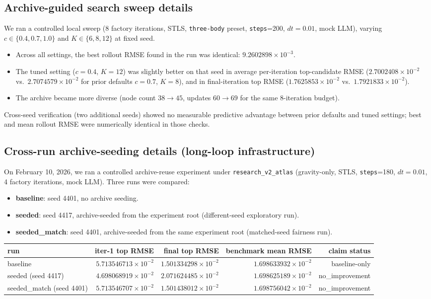 \documentclass[11pt]{article}
\begin{document}
\subsection{Archive-guided search sweep details}
We ran a controlled local sweep (8 factory iterations, STLS, \texttt{three-body} preset, \texttt{steps}=200, $dt=0.01$, mock LLM), varying $c\in\{0.4,0.7,1.0\}$ and $K\in\{6,8,12\}$ at fixed seed.
\begin{itemize}
\item Across all settings, the best rollout RMSE found in the run was identical: $9.2602898\times 10^{-3}$.
\item The tuned setting ($c=0.4$, $K=12$) was slightly better on that seed in average per-iteration top-candidate RMSE ($2.7002408\times 10^{-2}$ vs.\ $2.7074579\times 10^{-2}$ for prior defaults $c=0.7$, $K=8$), and in final-iteration top RMSE ($1.7625853\times 10^{-2}$ vs.\ $1.7921833\times 10^{-2}$).
\item The archive became more diverse (node count $38\rightarrow45$, updates $60\rightarrow69$ for the same 8-iteration budget).
\end{itemize}
Cross-seed verification (two additional seeds) showed no measurable predictive advantage between prior defaults and tuned settings; best and mean rollout RMSE were numerically identical in those checks.

\subsection{Cross-run archive-seeding details (long-loop infrastructure)}
On February 10, 2026, we ran a controlled archive-reuse experiment under \texttt{research\_v2\_atlas} (gravity-only, STLS, \texttt{steps}=180, $dt=0.01$, 4 factory iterations, mock LLM). Three runs were compared:
\begin{itemize}
\item \textbf{baseline}: seed 4401, no archive seeding.
\item \textbf{seeded}: seed 4417, archive-seeded from the experiment root (different-seed exploratory run).
\item \textbf{seeded\_match}: seed 4401, archive-seeded from the same experiment root (matched-seed fairness run).
\end{itemize}

\begin{center}
\begin{tabular}{lrrrr}
\hline
run & iter-1 top RMSE & final top RMSE & benchmark mean RMSE & claim status \\
\hline
baseline & $5.713546713\times 10^{-2}$ & $1.501334298\times 10^{-2}$ & $1.698633932\times 10^{-2}$ & baseline-only \\
seeded (seed 4417) & $4.698068919\times 10^{-2}$ & $2.071624485\times 10^{-2}$ & $1.698625189\times 10^{-2}$ & no\_improvement \\
seeded\_match (seed 4401) & $5.713546707\times 10^{-2}$ & $1.501438012\times 10^{-2}$ & $1.698756042\times 10^{-2}$ & no\_improvement \\
\hline
\end{tabular}
\end{center}
\end{document}
